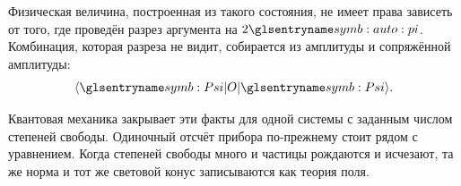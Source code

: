 Физическая величина, построенная из такого состояния,
не имеет права зависеть от того, где проведён разрез аргумента на $2\symPi$.
Комбинация, которая разреза не видит, собирается из амплитуды и сопряжённой амплитуды:
\begin{equation}
  \langle\wavePsi|O|\wavePsi\rangle.
  \label{eq:observable}
\end{equation}

Квантовая механика закрывает эти факты для одной системы с заданным числом степеней свободы.
Одиночный отсчёт прибора по-прежнему стоит рядом с уравнением.
Когда степеней свободы много и частицы рождаются и исчезают,
та же норма и тот же световой конус записываются как теория поля.

